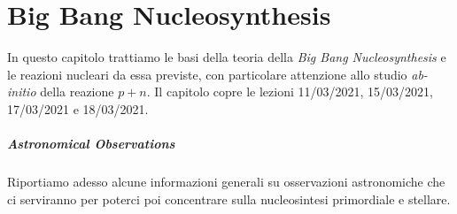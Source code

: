 \newcommand{\sol}{_{\odot}}
\newcommand{\Msol}{$M\sol { }$}


\chapter{Big Bang Nucleosynthesis}\label{cap-BBN}
In questo capitolo trattiamo le basi della teoria della \textit{Big Bang Nucleosynthesis} e le reazioni nucleari da essa previste, con particolare attenzione allo studio \textit{ab-initio} della reazione $p+n$. Il capitolo copre le lezioni 11/03/2021, 15/03/2021, 17/03/2021 e 18/03/2021.

\paragraph{Astronomical Observations}
Riportiamo adesso alcune informazioni generali su osservazioni astronomiche che ci serviranno per poterci poi concentrare sulla nucleosintesi primordiale e stellare.

